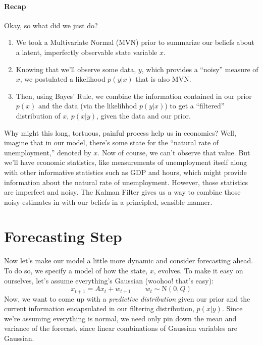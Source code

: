 \documentclass[a4paper,12pt]{article}
\begin{document}
\newpage
\paragraph{Recap} Okay, so what did we just do? 
\begin{enumerate} 
    \item We took a Multivariate Normal (MVN) prior to 
	summarize our beliefs about a latent, imperfectly 
    observable state variable $x$. 
    \item Knowing that we'll observe some data, $y$, which
	provides a ``noisy'' measure of $x$, we postulated a 
	likelihood $p(y|x)$ that is also MVN. 
    \item Then, using Bayes' Rule, we combine the information
	contained in our prior $p(x)$ and the data (via
	the likelihhod $p(y|x)$) to get a ``filtered'' 
	distribution of $x$, $p(x|y)$, given the data and our
	prior.
\end{enumerate} 
Why might this long, tortuous, painful process help us in
economics?  Well, imagine that in our model, there's some 
state for the ``natural rate of unemployment,'' denoted by $x$.  
Now of course, we can't observe that value.  But we'll have
economic statistics, like measurements of unemployment itself along 
with other informative statistics such as GDP
and hours, which might provide information about the natural
rate of unemployment.
However, those statistics are imperfect and noisy.  The
Kalman Filter gives us a way to combine those noisy estimates
in with our beliefs in a principled, sensible manner.


\section{Forecasting Step}

Now let's make our model a little more dynamic and consider 
forecasting ahead. To do so, we specify a model
of how the state, $x$, evolves.  To make it easy on ourselves,
let's assume everything's Gaussian (woohoo! that's easy):
\begin{equation}
    \label{lom}
    x_{t+1} = Ax_t + w_{t+1} \qquad w_t \sim \text{N}(0, Q)
\end{equation}
Now, we want to come up with a \emph{predictive distribution}
given our prior and the current information encapsulated in 
our filtering distribution, $p(x|y)$. Since we're assuming
everything is normal, we need only pin down the
mean and variance of the forecast, since linear combinations
of Gaussian variables are Gaussian.  
\end{document}

